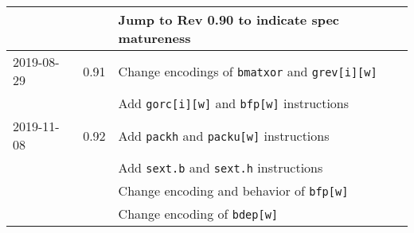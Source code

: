 \documentclass[twoside,11pt]{book}
\begin{document}
\begin{center}
\begin{tabular}{lll}
           &      & Jump to Rev 0.90 to indicate spec matureness \\
\hline
2019-08-29 & 0.91 & Change encodings of {\tt bmatxor} and {\tt grev[i][w]} \\
	   &      & Add {\tt gorc[i][w]} and {\tt bfp[w]} instructions \\
\hline
2019-11-08 & 0.92 & Add {\tt packh} and {\tt packu[w]} instructions \\
	   &      & Add {\tt sext.b} and {\tt sext.h} instructions \\
	   &      & Change encoding and behavior of {\tt bfp[w]} \\
	   &      & Change encoding of {\tt bdep[w]} \\
\hline
\end{tabular}
\end{center}



\end{document}
